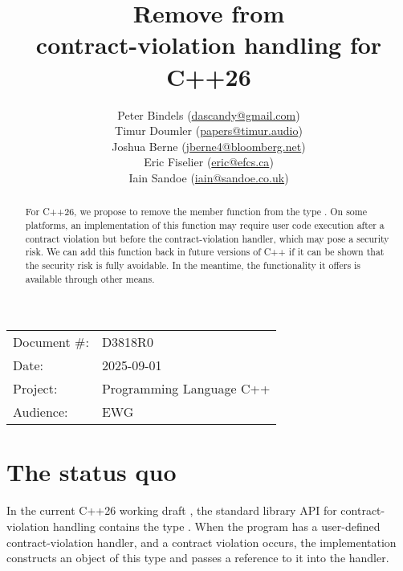 

 \usepackage[bottom]{footmisc} 



\title{Remove  from \\ contract-violation handling for C++26}
\author{
  Peter Bindels \small(\href{mailto:dascandy@gmail.com}{dascandy@gmail.com}) \\
  Timur Doumler \small(\href{mailto:papers@timur.audio}{papers@timur.audio}) \\
  Joshua Berne \small(\href{mailto:jberne4@bloomberg.net}{jberne4@bloomberg.net}) \\ 
  Eric Fiselier \small(\href{mailto:eric@efcs.ca}{eric@efcs.ca}) \\
  Iain Sandoe \small(\href{mailto:iain@sandoe.co.uk}{iain@sandoe.co.uk})
}
\date{}
\maketitle

\begin{tabular}{ll}
Document \#: & D3818R0 \\
Date: &2025-09-01 \\
Project: & Programming Language C++ \\
Audience: & EWG
\end{tabular}

\begin{abstract}
For C++26, we propose to remove the member function  from the type . On some platforms, an implementation of this function may require user code execution after a contract violation but before the contract-violation handler, which may pose a security risk. We can add this function back in future versions of C++ if it can be shown that the security risk is fully avoidable. In the meantime, the functionality it offers is available through other means.
\end{abstract}


\section{The status quo}

In the current C++26 working draft \cite{N5014}, the standard library API for contract-violation handling contains the type . When the program has a user-defined contract-violation handler, and a contract violation occurs, the implementation constructs an object of this type and passes a reference to it into the handler.

